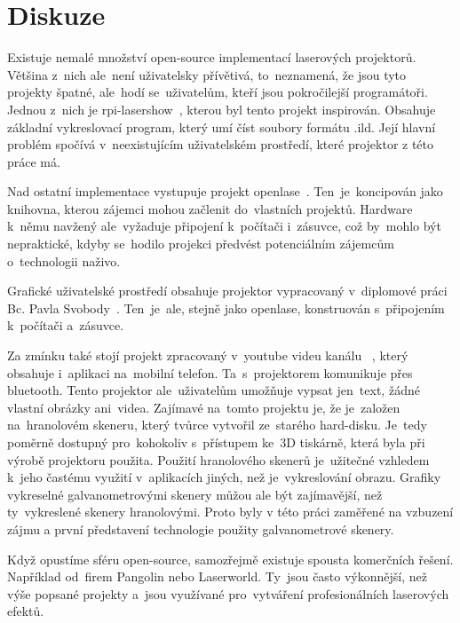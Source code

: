\chapter*{Diskuze}

Existuje nemalé množství open-source implementací laserových projektorů.
Většina z~nich ale~není uživatelsky přívětivá, to~neznamená, že jsou tyto projekty špatné, ale~hodí se~uživatelům, kteří jsou pokročilejší programátoři. 
Jednou z~nich je rpi-lasershow~\cite{rpi-lasershow}, kterou byl tento projekt inspirován. Obsahuje základní vykreslovací program, který umí číst soubory formátu .ild. Její hlavní problém spočívá v~neexistujícím uživatelském prostředí, které projektor z této práce má.

Nad ostatní implementace vystupuje projekt openlase~\cite{openlase}. Ten~je~koncipován jako knihovna, kterou zájemci mohou začlenit do~vlastních projektů.
Hardware k~němu navžený ale~vyžaduje připojení k~počítači i~zásuvce, což by~mohlo být nepraktické, kdyby se~hodilo projekci předvést potenciálním zájemcům o~technologii naživo.

Grafické uživatelské prostředí obsahuje projektor vypracovaný v~diplomové práci Bc. Pavla Svobody~\cite{vut-chabr}. Ten~je~ale, stejně jako openlase, konstruován s~připojením k~počítači a~zásuvce.

Za zmínku také stojí projekt zpracovaný v~youtube videu kanálu ~\cite{harddrive-projector-youtube}, který obsahuje i~aplikaci na~mobilní telefon. Ta~s~projektorem komunikuje přes bluetooth. Tento projektor ale~uživatelům umožňuje vypsat jen~text, žádné vlastní obrázky ani~videa.
Zajímavé na~tomto projektu je, že je~založen na~hranolovém skeneru, který tvůrce vytvořil ze~starého hard-disku. Je~tedy poměrně dostupný pro~kohokoliv s~přístupem ke~3D tiskárně, která byla při výrobě projektoru použita.
Použití hranolového skenerů je~užitečné vzhledem k~jeho častému využití v~aplikacích jiných, než je~vykreslování obrazu.
Grafiky vykreselné galvanometrovými skenery můžou ale být zajímavější, než ty~vykreslené skenery hranolovými.
Proto byly v této práci zaměřené na vzbuzení zájmu a první představení technologie použity galvanometrové skenery.

Když opustíme sféru open-source, samozřejmě existuje spousta komerčních řešení. Například od~firem Pangolin nebo Laserworld. Ty~jsou často výkonnější, než výše popsané projekty a~jsou využívané pro~vytváření profesionálních laserových efektů.

